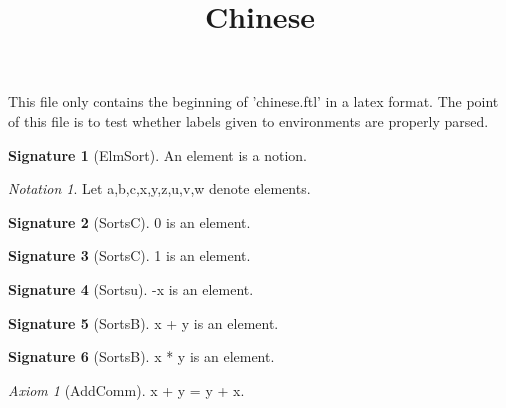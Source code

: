 \documentclass[a4paper,draft]{amsproc}
\title{\textbf{Chinese}}
\date{}
\begin{document}
\theoremstyle{plain}
 \newtheorem{ftltheorem}{Theorem}[section]
 \newtheorem{theorem}{Theorem}[section]
 \newtheorem{ftlproposition}{Proposition}[section]
 \newtheorem{ftllemma}{Lemma}[section]
 \newtheorem{ftlcorollary}{Corollary}[section]
\theoremstyle{definition}
 \newtheorem{example}{Example}[section]
 \newtheorem{ftldefinition}{Definition}[section]
 \newtheorem{signature}{Signature}[section]
\theoremstyle{remark}
 \newtheorem{remark}{Remark}[section]
 \newtheorem{notation}{Notation}[section]
\theoremstyle{axiom}
 \newtheorem{ftlaxiom}{Axiom}[section]

\newenvironment{parser}{}{}
\maketitle

This file only contains the beginning of 'chinese.ftl' in a latex format. The point of this file is to test whether labels given to environments are properly parsed.

\begin{parser}[synonym element/-s]\end{parser}

\begin{signature}[ElmSort]
An element is a notion.
\end{signature}

\begin{notation}
Let a,b,c,x,y,z,u,v,w denote elements.
\end{notation}

\begin{signature}[SortsC]
0 is an element.
\end{signature}

\begin{signature}[SortsC]
1 is an element.
\end{signature}

\begin{signature}[Sortsu]
-x is an element.
\end{signature}

\begin{signature}[SortsB]
x + y is an element.
\end{signature}

\begin{signature}[SortsB]
x * y is an element.
\end{signature}

\begin{ftlaxiom}[AddComm]
x + y = y + x.
\end{ftlaxiom}
\end{document}
